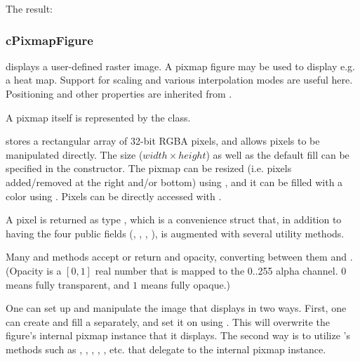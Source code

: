 
The result:

\begin{center}
\end{center}


\subsubsection{cPixmapFigure}
\label{sec:graphics:pixmapfigure}

 displays a user-defined raster image. A pixmap
figure may be used to display e.g. a heat map. Support for scaling and
various interpolation modes are useful here. Positioning and other
properties are inherited from .

A pixmap itself is represented by the  class.

 stores a rectangular array of 32-bit RGBA pixels,
and allows pixels to be manipulated directly. The size ($width \times
height$) as well as the default fill can be specified in the constructor.
The pixmap can be resized (i.e. pixels added/removed at the right and/or bottom)
using , and it can be filled with a color using .
Pixels can be directly accessed with .

A pixel is returned as type , which is a convenience
struct that, in addition to having the four public  fields
(, , , ), is augmented with several
utility methods.

Many  and  methods accept or return
 and opacity, converting between them and
. (Opacity is a $[0,1]$ real number that is mapped to the
0..255 alpha channel. $0$ means fully transparent, and $1$ means fully
opaque.)

One can set up and manipulate the image that  displays
in two ways. First, one can create and fill a 
separately, and set it on  using .
This will overwrite the figure's internal pixmap instance that it displays.
The second way is to utilize 's methods such as
, , ,
, , etc. that delegate to
the internal pixmap instance.

